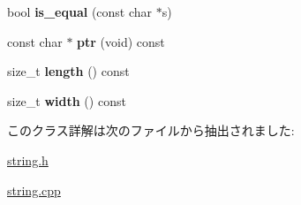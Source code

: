 \begin{DoxyCompactItemize}
\item 
\hypertarget{classstring_a79ff672153e3e430d940861ec58306b3}{}bool {\bfseries is\+\_\+equal} (const char $\ast$s)\label{classstring_a79ff672153e3e430d940861ec58306b3}

\item 
\hypertarget{classstring_ad2e55e186710adaff9fd5444ea250b2a}{}const char $\ast$ {\bfseries ptr} (void) const \label{classstring_ad2e55e186710adaff9fd5444ea250b2a}

\item 
\hypertarget{classstring_a6b79c8076d0909e58931b73850f7fc39}{}size\+\_\+t {\bfseries length} () const \label{classstring_a6b79c8076d0909e58931b73850f7fc39}

\item 
\hypertarget{classstring_ab32ec8d3c9cae50cb6e7b65e745883b6}{}size\+\_\+t {\bfseries width} () const \label{classstring_ab32ec8d3c9cae50cb6e7b65e745883b6}

\end{DoxyCompactItemize}


このクラス詳解は次のファイルから抽出されました\+:\begin{DoxyCompactItemize}
\item 
\hyperlink{string_8h}{string.\+h}\item 
\hyperlink{string_8cpp}{string.\+cpp}\end{DoxyCompactItemize}
